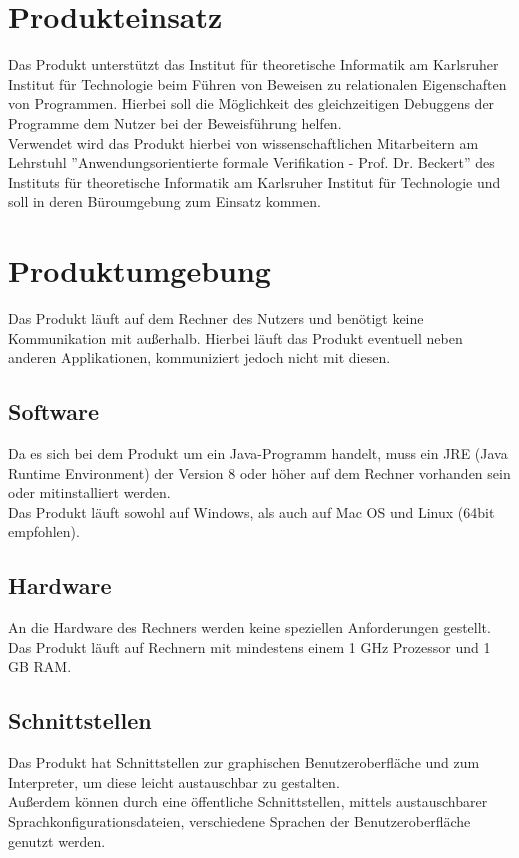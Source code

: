 \documentclass[parskip=full]{scrartcl}
\begin{document}
\section{Produkteinsatz}
Das Produkt unterstützt das Institut für theoretische Informatik am Karlsruher Institut für Technologie beim Führen von Beweisen zu relationalen Eigenschaften von Programmen. Hierbei soll die Möglichkeit des gleichzeitigen Debuggens der Programme dem Nutzer bei der Beweisführung helfen. \\
Verwendet wird das Produkt hierbei von wissenschaftlichen Mitarbeitern am Lehrstuhl ''Anwendungsorientierte formale Verifikation - Prof. Dr. Beckert'' des Instituts für theoretische Informatik am Karlsruher Institut für Technologie und soll in deren Büroumgebung zum Einsatz kommen. 

 
 \newpage

\section{Produktumgebung}
Das Produkt läuft auf dem Rechner des Nutzers und benötigt keine Kommunikation mit außerhalb. Hierbei läuft das Produkt eventuell neben anderen Applikationen, kommuniziert jedoch nicht mit diesen.

\subsection{Software}
Da es sich bei dem Produkt um ein Java-Programm handelt, muss ein JRE (Java Runtime Environment) der Version 8 oder höher auf dem Rechner vorhanden sein oder mitinstalliert werden. \\
Das Produkt läuft sowohl auf Windows, als auch auf Mac OS und Linux (64bit empfohlen).

\subsection{Hardware}
An die Hardware des Rechners werden keine speziellen Anforderungen gestellt. Das Produkt läuft auf Rechnern mit mindestens einem 1 GHz Prozessor und 1 GB RAM.

\subsection{Schnittstellen}
Das Produkt hat Schnittstellen zur graphischen Benutzeroberfläche und zum Interpreter, um diese leicht austauschbar zu gestalten. \\
Außerdem können durch eine öffentliche Schnittstellen, mittels austauschbarer Sprachkonfigurationsdateien, verschiedene Sprachen der Benutzeroberfläche genutzt werden. 
\end{document}
